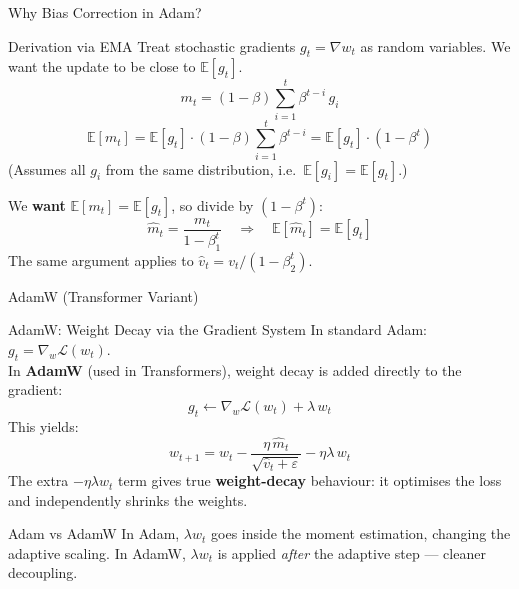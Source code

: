 \documentclass{beamer}
\begin{document}
\begin{frame}[shrink=10]{Why Bias Correction in Adam?}
  \begin{block}{Derivation via EMA}
    Treat stochastic gradients $g_t = \nabla w_t$ as random variables.
    We want the update to be close to $\mathbb{E}[g_t]$.
    \[
      m_t = (1-\beta)\sum_{i=1}^{t}\beta^{t-i}\,g_i
    \]
    \[
      \mathbb{E}[m_t]
        = \mathbb{E}[g_t]\cdot(1-\beta)\sum_{i=1}^{t}\beta^{t-i}
        = \mathbb{E}[g_t]\cdot(1-\beta^t)
    \]
    (Assumes all $g_i$ from the same distribution,
    i.e.\ $\mathbb{E}[g_i]=\mathbb{E}[g_t]$.)

    \medskip

    We \textbf{want} $\mathbb{E}[m_t] = \mathbb{E}[g_t]$,
    so divide by $(1-\beta^t)$:
    \[
      \hat{m}_t = \frac{m_t}{1-\beta_1^t}
      \quad\Rightarrow\quad
      \mathbb{E}[\hat{m}_t] = \mathbb{E}[g_t]
    \]
    The same argument applies to $\hat{v}_t = v_t/(1-\beta_2^t)$.
  \end{block}
\end{frame}

\begin{frame}[shrink=10]{AdamW (Transformer Variant)}
  \begin{block}{AdamW: Weight Decay via the Gradient System}
    In standard Adam: $g_t = \nabla_w\mathcal{L}(w_t)$.\\[4pt]
    In \textbf{AdamW} (used in Transformers), weight decay is added
    directly to the gradient:
    \[
      g_t \leftarrow \nabla_w\mathcal{L}(w_t) + \lambda\,w_t
    \]
    This yields:
    \[
      w_{t+1}
        = w_t
        - \frac{\eta\,\hat{m}_t}{\sqrt{\hat{v}_t+\varepsilon}}
        - \eta\lambda\,w_t
    \]
    The extra $-\eta\lambda w_t$ term gives true
    \textbf{weight-decay} behaviour: it optimises the loss
    and independently shrinks the weights.
  \end{block}

  \medskip

  \begin{exampleblock}{Adam vs AdamW}
    In Adam, $\lambda w_t$ goes inside the moment estimation,
    changing the adaptive scaling.
    In AdamW, $\lambda w_t$ is applied \emph{after} the
    adaptive step --- cleaner decoupling.
  \end{exampleblock}
\end{frame}
\end{document}
